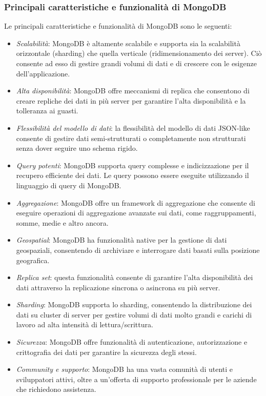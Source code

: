 \subsubsection{Principali caratteristiche e funzionalità di MongoDB}

Le principali caratteristiche e funzionalità di MongoDB sono le seguenti:

\begin{itemize}
    \item \textit{Scalabilità}: MongoDB è altamente scalabile e supporta sia la scalabilità orizzontale (sharding) che quella verticale (ridimensionamento dei server). Ciò consente ad esso di gestire grandi volumi di dati e di crescere con le esigenze dell'applicazione. 
    \item \textit{Alta disponibilità}: MongoDB offre meccanismi di replica che consentono di creare repliche dei dati in più server per garantire l'alta disponibilità e la tolleranza ai guasti.
    \item \textit{Flessibilità del modello di dati}: la flessibilità del modello di dati JSON-like consente di gestire dati semi-strutturati o completamente non strutturati senza dover seguire uno schema rigido.
    \item \textit{Query potenti}: MongoDB supporta query complesse e indicizzazione per il recupero efficiente dei dati. Le query possono essere eseguite utilizzando il linguaggio di query di MongoDB. 
    \item \textit{Aggregazione}: MongoDB offre un framework di aggregazione che consente di eseguire operazioni di aggregazione avanzate sui dati, come raggruppamenti, somme, medie e altro ancora. 
    \item \textit{Geospatial}: MongoDB ha funzionalità native per la gestione di dati geospaziali, consentendo di archiviare e interrogare dati basati sulla posizione geografica. 
    \item \textit{Replica set}: questa funzionalità consente di garantire l'alta disponibilità dei dati attraverso la replicazione sincrona o asincrona su più server. 
    \item \textit{Sharding}: MongoDB supporta lo sharding, consentendo la distribuzione dei dati su cluster di server per gestire volumi di dati molto grandi e carichi di lavoro ad alta intensità di lettura/scrittura. 
    \item \textit{Sicurezza}: MongoDB offre funzionalità di autenticazione, autorizzazione e crittografia dei dati per garantire la sicurezza degli stessi. 
    \item \textit{Community e supporto}: MongoDB ha una vasta comunità di utenti e sviluppatori attivi, oltre a un'offerta di supporto professionale per le aziende che richiedono assistenza.
\end{itemize}

